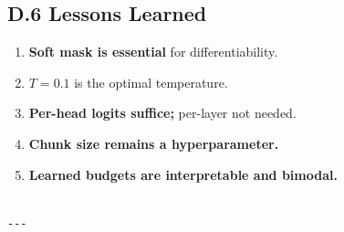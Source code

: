 \subsection{D.6 Lessons Learned}

\begin{enumerate}
\item \textbf{Soft mask is essential} for differentiability.
\item \textbf{$T = 0.1$} is the optimal temperature.
\item \textbf{Per-head logits suffice;} per-layer not needed.
\item \textbf{Chunk size remains a hyperparameter.}
\item \textbf{Learned budgets are interpretable and bimodal.}
\end{enumerate}
\begin{lstlisting}

---
\end{lstlisting}